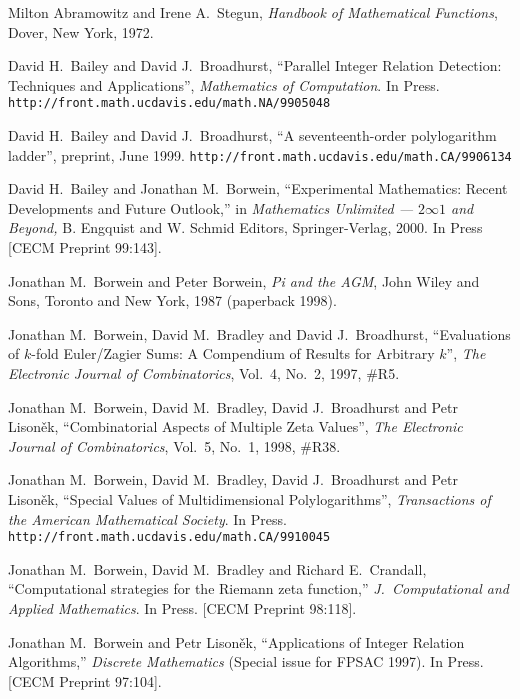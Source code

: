 \documentclass[a4paper,a4paper]{article}
\begin{document}
\raggedright
\begin{thebibliography}{99}

Milton Abramowitz and Irene A.\ Stegun,
{\it Handbook of Mathematical Functions},
Dover, New York, 1972.

David H.\ Bailey and David J.\ Broadhurst,
``Parallel Integer Relation Detection: Techniques and Applications'',
{\it Mathematics of Computation}. In Press.
{\tt http://front.math.ucdavis.edu/math.NA/9905048}

David H.\ Bailey and David J.\ Broadhurst,
``A seventeenth-order polylogarithm ladder'',
preprint, June 1999.
{\tt http://front.math.ucdavis.edu/math.CA/9906134}

 David H.\ Bailey and Jonathan M.\ Borwein,
``Experimental Mathematics: Recent
Developments and Future Outlook,'' in  {\it Mathematics Unlimited ---
$2\infty1$ and Beyond,} B. Engquist and W. Schmid Editors,
Springer-Verlag, 2000. In Press [CECM Preprint 99:143].

Jonathan M.\ Borwein and Peter Borwein,
{\it Pi and the AGM},
John Wiley and Sons, Toronto  and New York, 1987 (paperback 1998).

Jonathan M.\ Borwein, David M.\ Bradley and David J.\ Broadhurst,
``Evaluations of $k$-fold Euler/Zagier Sums:
A Compendium of Results for Arbitrary $k$'',
{\it The Electronic Journal of Combinatorics},
Vol.~4, No.~2, 1997, \#R5.

Jonathan M.\ Borwein, David M.\ Bradley, David J.\ Broadhurst
and Petr Lison\v ek,
``Combinatorial Aspects of Multiple Zeta Values'',
{\it The Electronic Journal of Combinatorics},
Vol.~5, No.~1, 1998, \#R38.

Jonathan M.\ Borwein, David M.\ Bradley, David J.\ Broadhurst
and Petr Lison\v ek,
``Special Values of Multidimensional Polylogarithms'',
{\it Transactions of the American Mathematical Society}. In Press.
{\tt http://front.math.ucdavis.edu/math.CA/9910045}

Jonathan M.\ Borwein, David M.\ Bradley and Richard E.\ Crandall,
``Computational strategies for  the Riemann zeta function,''
{\it J.\ Computational and Applied Mathematics}. In Press.
[CECM Preprint 98:118].

Jonathan M.\ Borwein and Petr Lison\v ek,
``Applications of Integer Relation Algorithms,''
{\it Discrete Mathematics} (Special issue for FPSAC 1997).
In Press.
[CECM Preprint 97:104].


\end{thebibliography}
\end{document}
